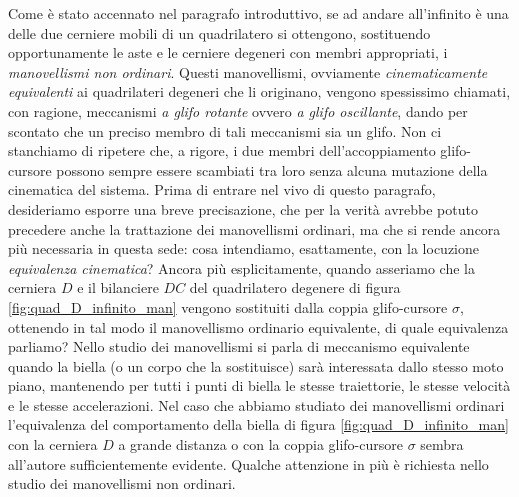\noindent Come \`e stato accennato nel paragrafo introduttivo, se ad andare
all'infinito \`e una delle due cerniere mobili di un quadrilatero si ottengono,
sostituendo opportunamente le aste e le cerniere degeneri con
membri appropriati,
i {\em manovellismi non ordinari}. Questi manovellismi, ovviamente {\em cinematicamente
equivalenti} ai quadrilateri degeneri che li 
originano,
vengono spessissimo chiamati, con ragione,
meccanismi 
{\em a glifo rotante} ovvero
{\em a glifo oscillante},
dando per scontato che un preciso membro di tali meccanismi
sia un glifo. Non ci stanchiamo
di ripetere che, a rigore, i due membri dell'accoppiamento glifo-cursore
possono sempre essere scambiati tra loro senza alcuna mutazione
della cinematica del sistema.
Prima di entrare nel vivo di questo paragrafo, desideriamo esporre una breve
precisazione, che per la verit\`a avrebbe potuto precedere anche la
trattazione dei manovellismi ordinari, ma che si rende ancora
pi\`u necessaria in questa sede: cosa
intendiamo, esattamente, con la locuzione
{\em equivalenza cinematica}? Ancora pi\`u esplicitamente, quando asseriamo che la cerniera
$D$ e il bilanciere $DC$ del quadrilatero
degenere di figura \ref{fig:quad_D_infinito_man} vengono sostituiti
dalla coppia glifo-cursore $\sigma$, ottenendo in tal modo il
manovellismo ordinario
equivalente, di quale equivalenza parliamo?
Nello studio dei manovellismi si parla di meccanismo equivalente
quando la biella (o un corpo che la sostituisce) sar\`a interessata dallo
stesso moto piano, mantenendo per tutti i punti di biella le stesse
traiettorie, le stesse velocit\`a e le stesse accelerazioni. Nel
caso che abbiamo studiato dei manovellismi ordinari l'equivalenza
del comportamento della biella di figura \ref{fig:quad_D_infinito_man} con
la cerniera $D$ a grande distanza o con la coppia glifo-cursore $\sigma$ 
sembra all'autore sufficientemente evidente.
Qualche attenzione in pi\`u \`e richiesta
nello studio dei manovellismi non ordinari.

